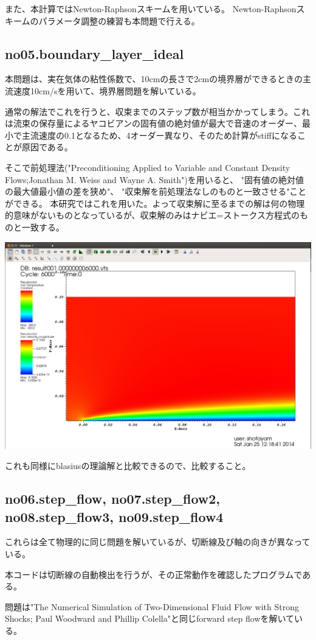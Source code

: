\documentclass{jsarticle}
\begin{document}
また、本計算ではNewton-Raphsonスキームを用いている。
Newton-Raphsonスキームのパラメータ調整の練習も本問題で行える。
\subsection{no05.boundary\_layer\_ideal}%
本問題は、実在気体の粘性係数で、10cmの長さで2cmの境界層ができるときの主流速度10cm/sを用いて、境界層問題を解いている。

通常の解法でこれを行うと、収束までのステップ数が相当かかってしまう。これは流束の保存量によるヤコビアンの固有値の絶対値が最大で音速のオーダー、最小で主流速度の0.1となるため、4オーダー異なり、そのため計算がstiffになることが原因である。

そこで前処理法("Preconditioning Applied to Variable and Constant Density Flows;Jonathan M. Weiss and Wayne A. Smith")を用いると、
"固有値の絶対値の最大値最小値の差を狭め"、
"収束解を前処理法なしのものと一致させる"ことができる。
本研究ではこれを用いた。よって収束解に至るまでの解は何の物理的意味がないものとなっているが、収束解のみはナビエ=ストークス方程式のものと一致する。
\begin{center}
\includegraphics[width=.8\textwidth,bb=0 0 1569 1059]{sample/no05.png}
\end{center}
これも同様にblasiusの理論解と比較できるので、比較すること。
\subsection{no06.step\_flow, no07.step\_flow2, no08.step\_flow3, no09.step\_flow4}%
これらは全て物理的に同じ問題を解いているが、切断線及び軸の向きが異なっている。

本コードは切断線の自動検出を行うが、その正常動作を確認したプログラムである。

問題は"The Numerical Simulation of Two-Dimensional Fluid Flow with Strong Shocks; Paul Woodward and Phillip Colella"と同じforward step flowを解いている。
\end{document}
